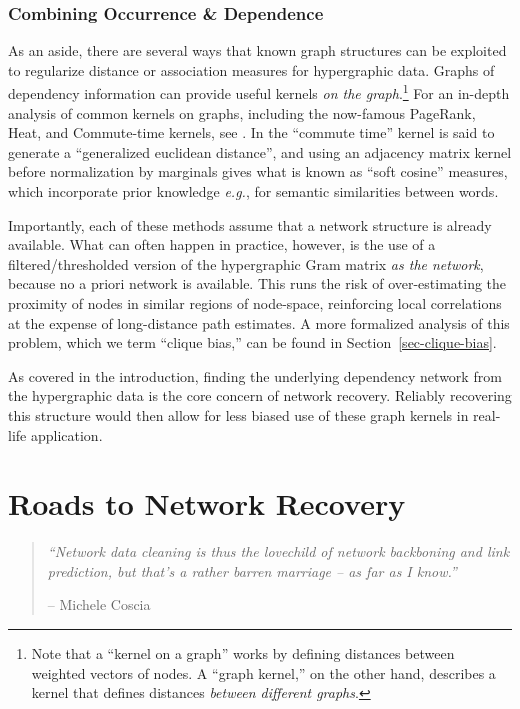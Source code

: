 \documentclass[%
	12pt,
		oneside,
		letterpaper
]{book}
\begin{document}
\subsection{Combining Occurrence \&
Dependence}\label{combining-occurrence-dependence}

As an aside, there are several ways that known graph structures can be
exploited to regularize distance or association measures for
hypergraphic data. Graphs of dependency information can provide useful
kernels \emph{on the graph}.\footnote{ Note that a ``kernel on a graph''
  works by defining distances between weighted vectors of nodes. A
  ``graph kernel,'' on the other hand, describes a kernel that defines
  distances \emph{between different graphs}.} For an in-depth analysis
of common kernels on graphs, including the now-famous PageRank, Heat,
and Commute-time kernels, see
\textcite{SimilaritiesgraphsKernels_Avrachenkov2019}. In
\textcite{GeneralizedEuclideanmeasure_Coscia2020} the ``commute time''
kernel is said to generate a ``generalized euclidean distance'', and
using an adjacency matrix kernel before normalization by marginals gives
what is known as ``soft cosine'' measures, which incorporate prior
knowledge \emph{e.g.}, for semantic similarities between words.

Importantly, each of these methods assume that a network structure is
already available. What can often happen in practice, however, is the
use of a filtered/thresholded version of the hypergraphic Gram matrix
\emph{as the network}, because no a priori network is available. This
runs the risk of over-estimating the proximity of nodes in similar
regions of node-space, reinforcing local correlations at the expense of
long-distance path estimates. A more formalized analysis of this
problem, which we term ``clique bias,'' can be found in
Section~\ref{sec-clique-bias}.

As covered in the introduction, finding the underlying dependency
network from the hypergraphic data is the core concern of network
recovery. Reliably recovering this structure would then allow for less
biased use of these graph kernels in real-life application.

\chapter{Roads to Network Recovery}\label{sec-lit-review}

\begin{flushright}

\begin{minipage}{.7\linewidth}

\singlespacing

\begin{quote}
\emph{``Network data cleaning is thus the lovechild of network
backboning and link prediction, but that's a rather barren marriage --
as far as I know.''}

\hfill -- Michele Coscia\\
\doublespacing
\end{quote}

\end{minipage}

\end{flushright}
\end{document}
